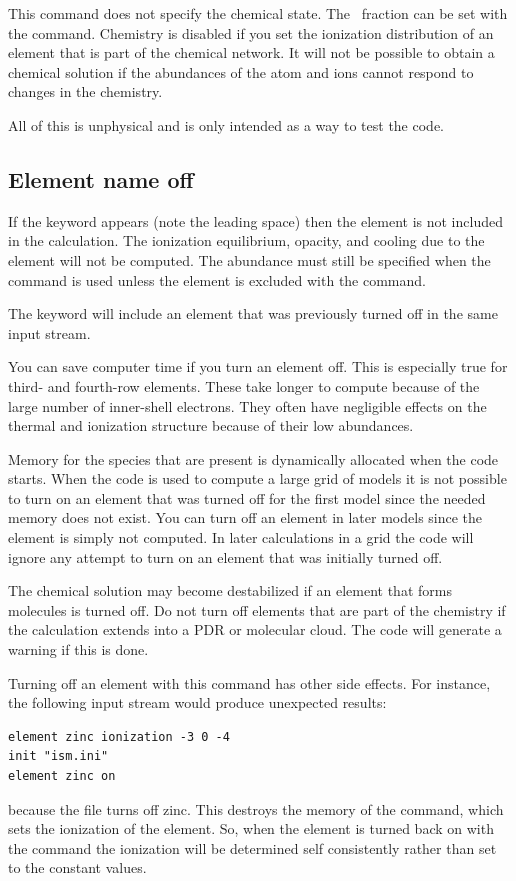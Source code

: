 This command does not specify the chemical state.
The \htwo\ fraction can
be set with the  command.
Chemistry is disabled if you set the ionization distribution of an element
that is part of the chemical network.
It will not be possible to obtain
a chemical solution if the abundances of the atom and ions cannot respond
to changes in the chemistry.

All of this is unphysical and is only intended as a way to test the code.

\subsection{Element name off}

If the keyword  appears
(note the leading space) then the element
is not included in the calculation.
The ionization equilibrium, opacity,
and cooling due to the element will not be computed.
The abundance must
still be specified when the  command is
used unless the element is excluded with the 
command.

The keyword  will include an element that was
previously turned off in the same input stream.

You can save computer time if you turn an element off.
This is especially
true for third- and fourth-row elements.
These take longer to compute
because of the large number of inner-shell electrons.
They often have
negligible effects on the thermal and ionization structure because of
their low abundances.

Memory for the species that are present is dynamically allocated when
the code starts.
When the code is used to compute a large grid of models
it is not possible to turn on an element that was turned off for the first
model since the needed memory does not exist.
You can turn off an element
in later models since the element is simply not computed.
In later
calculations in a grid the code will ignore any attempt to turn on an
element that was initially turned off.

The chemical solution may become destabilized if an element that forms
molecules is turned off.
Do not turn off elements that are part of the
chemistry if the calculation extends into a PDR or molecular cloud.
The
code will generate a warning if this is done.

Turning off an element with this command has other side effects.
For instance, the following input stream would produce unexpected results:
\begin{verbatim}
element zinc ionization -3 0 -4
init "ism.ini"
element zinc on
\end{verbatim}
because the  file turns off zinc.
This destroys the memory of the
 command,
which sets the ionization of the element.
So, when the element is turned back on with the
 command
the ionization will be determined self consistently rather than set to the
constant values.

